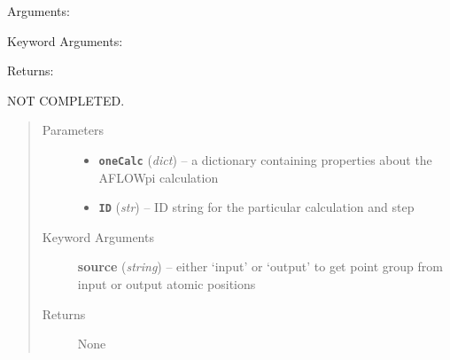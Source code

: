 \documentclass[letterpaper,10pt,english]{sphinxmanual}
\begin{document}

\begin{fulllineitems}
\label{retr:retr.getIbravFromVectors}
Arguments:

Keyword Arguments:

Returns:

\end{fulllineitems}


\begin{fulllineitems}
\label{retr:retr.getPointGroup}
NOT COMPLETED.
\begin{quote}\begin{description}
\item[{Parameters}] \leavevmode\begin{itemize}
\item {} 
\textbf{\texttt{oneCalc}} (\emph{dict}) -- a dictionary containing properties about the AFLOWpi calculation

\item {} 
\textbf{\texttt{ID}} (\emph{str}) -- ID string for the particular calculation and step

\end{itemize}

\item[{Keyword Arguments}] \leavevmode
\textbf{source} (\emph{string}) --
either `input' or `output' to get point group from input
or output atomic positions

\item[{Returns}] \leavevmode
None

\end{description}\end{quote}

\end{fulllineitems}

\end{document}
